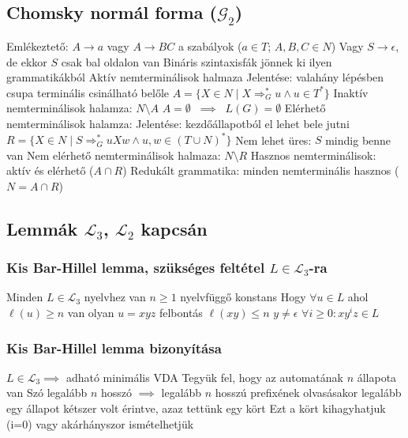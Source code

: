 \documentclass[12pt,a4paper]{article}
\newcommand{\gtos}{\Rightarrow_G^*}
\begin{document}
\pagebreak

\subsection{Chomsky normál forma ($\mathcal{G}_2$)}

\begin{outline}
	\1 Emlékeztető: $A \to a$ vagy $A \to BC$ a szabályok ($a \in T$; $A,B,C \in N$)
		\2 Vagy $S \to \epsilon$, de ekkor $S$ csak bal oldalon van
	\1 Bináris szintaxisfák jönnek ki ilyen grammatikákból
	\1 Aktív nemterminálisok halmaza
		\2 Jelentése: valahány lépésben csupa terminális csinálható belőle
		\2 $A = \{ X \in N \;|\; X \gtos u \wedge u \in T^* \}$
		\2 Inaktív nemterminálisok halamza: $N \setminus A$
		\2 $A = \emptyset \;\; \implies \;\; L(G) = \emptyset$
	\1 Elérhető nemterminálisok halamza:
		\2 Jelentése: kezdőállapotból el lehet bele jutni
		\2 $R = \{ X \in N \;|\; S \gtos uXw \wedge u,w \in (T \cup N)^* \}$
			\3 Nem lehet üres: $S$ mindig benne van
		\2 Nem elérhető nemterminálisok halmaza: $N \setminus R$
	\1 Hasznos nemterminálisok: aktív és elérhető ($A \cap R$)
	\1 Redukált grammatika: minden nemterminális hasznos ($N = A \cap R$)
\end{outline}

\pagebreak

\subsection{Lemmák $\mathcal{L}_3$, $\mathcal{L}_2$ kapcsán}

\subsubsection{Kis Bar-Hillel lemma, szükséges feltétel $L \in \mathcal{L}_3$-ra}

\begin{outline}
	\1 Minden $L \in \mathcal{L}_3$ nyelvhez van $n \ge 1$ nyelvfüggő konstans
	\1 Hogy $\forall u \in L$ ahol $\ell(u) \ge n$ van olyan $u = xyz$ felbontás
		\2 $\ell(xy) \le n$
		\2 $y \ne \epsilon$
		\2 $\forall i \ge 0: xy^i z \in L$
\end{outline}

\subsubsection{Kis Bar-Hillel lemma bizonyítása}

\begin{outline}
	\1 $L \in \mathcal{L}_3 \implies$ adható minimális VDA
	\1 Tegyük fel, hogy az automatának $n$ állapota van
	\1 Szó legalább $n$ hosszó $\implies$ legalább $n$ hosszú prefixének olvasásakor legalább egy állapot kétszer volt érintve, azaz tettünk egy kört
		\2 Ezt a kört kihagyhatjuk (i=0) vagy akárhányszor ismételhetjük
\end{outline}
\end{document}
